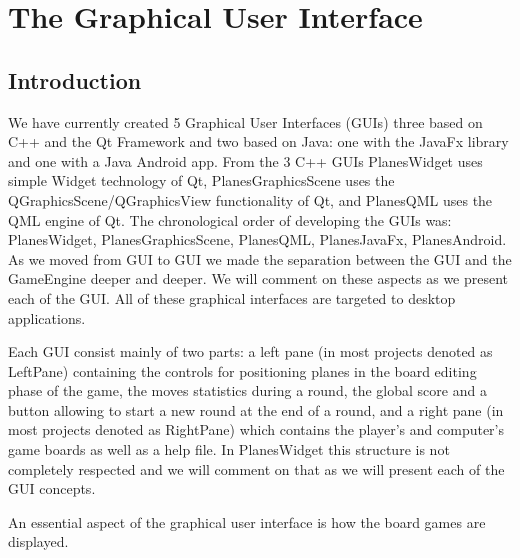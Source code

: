 \documentclass{report}
\begin{document}






\chapter {The Graphical User Interface}

\section{Introduction}

We have currently created 5 Graphical User Interfaces (GUIs) three based on C++ and the Qt Framework and two based on Java: one with the JavaFx library and one with a Java Android app. From the 3 C++ GUIs PlanesWidget uses simple Widget technology of Qt, PlanesGraphicsScene uses the QGraphicsScene/QGraphicsView functionality of Qt, and PlanesQML uses the QML engine of Qt. The chronological order of developing the GUIs was: PlanesWidget, PlanesGraphicsScene, PlanesQML, PlanesJavaFx, PlanesAndroid. As we moved from GUI to GUI we made the separation between the GUI and the GameEngine deeper and deeper. We will comment on these aspects as we present each of the GUI. All of these graphical interfaces are targeted to desktop applications.

Each GUI consist mainly of two parts: a left pane (in most projects denoted as LeftPane) containing the controls for positioning planes in the board editing phase of the game, the moves statistics during a round, the global score and a button allowing to start a new round at the end of a round, and a right pane (in most projects denoted as RightPane) which contains the player's and computer's game boards as well as a help file. In PlanesWidget this structure is not completely respected and we will comment on that as we will present each of the GUI concepts.

An essential aspect of the graphical user interface is how the board games are displayed. 






\end{document}
